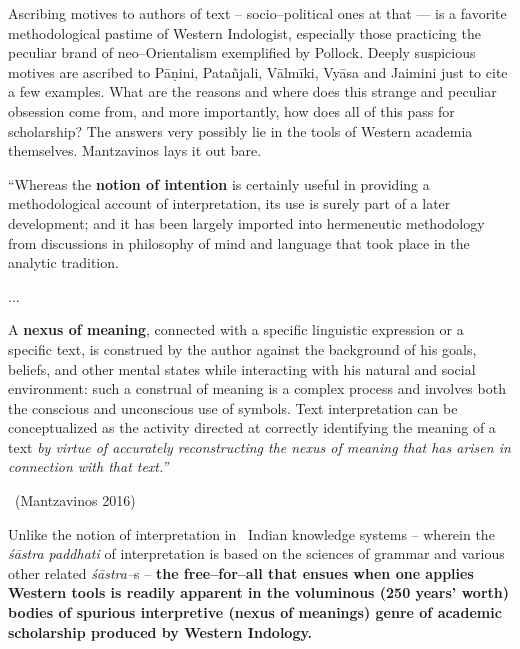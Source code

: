 Ascribing motives to authors of text – socio–political ones at that — is a favorite methodological pastime of Western Indologist, especially those practicing the peculiar brand of neo–Orientalism exemplified by Pollock. Deeply suspicious motives are ascribed to Pāṇini, Patañjali, Vālmīki, Vyāsa and Jaimini just to cite a few examples. What are the reasons and where does this strange and peculiar obsession come from, and more importantly, how does all of this pass for scholarship? The answers very possibly lie in the tools of Western academia themselves. Mantzavinos lays it out bare.

\begin{myquote}
“Whereas the \textbf{notion of intention} is certainly useful in providing a methodological account of interpretation, its use is surely part of a later development; and it has been largely imported into hermeneutic methodology from discussions in philosophy of mind and language that took place in the analytic tradition.
\end{myquote}

\begin{myquote}
...
\end{myquote}

\begin{myquote}
A \textbf{nexus of meaning}, connected with a specific linguistic expression or a specific text, is construed by the author against the background of his goals, beliefs, and other mental states while interacting with his natural and social environment: such a construal of meaning is a complex process and involves both the conscious and unconscious use of symbols. Text interpretation can be conceptualized as the activity directed at correctly identifying the meaning of a text \textit{by virtue of accurately reconstructing the nexus of meaning that has arisen in connection with that text.” }

~\hfill (Mantzavinos 2016)
\end{myquote}

Unlike the notion of interpretation in  Indian knowledge systems – wherein the \textit{śāstra paddhati} of interpretation is based on the sciences of grammar and various other related \textit{śāstra–}s – \textbf{the free–for–all that ensues when one applies Western tools is readily apparent in the voluminous (250 years’ worth) bodies of spurious interpretive (nexus of meanings) genre of academic scholarship produced by Western Indology.}

